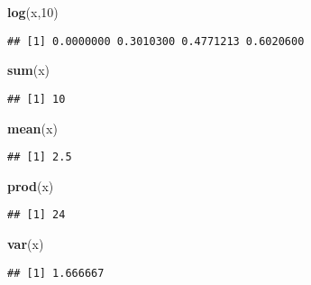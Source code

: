 \documentclass[]{article}
\newenvironment{Shaded}{\begin{snugshade}}{\end{snugshade}}
\newcommand{\KeywordTok}[1]{\textcolor[rgb]{0.13,0.29,0.53}{\textbf{#1}}}
\newcommand{\DecValTok}[1]{\textcolor[rgb]{0.00,0.00,0.81}{#1}}
\newcommand{\NormalTok}[1]{#1}
\begin{document}
\begin{Shaded}
\begin{Highlighting}[]
\KeywordTok{log}\NormalTok{(x,}\DecValTok{10}\NormalTok{)}
\end{Highlighting}
\end{Shaded}

\begin{verbatim}
## [1] 0.0000000 0.3010300 0.4771213 0.6020600
\end{verbatim}

\begin{Shaded}
\begin{Highlighting}[]
\KeywordTok{sum}\NormalTok{(x)}
\end{Highlighting}
\end{Shaded}

\begin{verbatim}
## [1] 10
\end{verbatim}

\begin{Shaded}
\begin{Highlighting}[]
\KeywordTok{mean}\NormalTok{(x)}
\end{Highlighting}
\end{Shaded}

\begin{verbatim}
## [1] 2.5
\end{verbatim}

\begin{Shaded}
\begin{Highlighting}[]
\KeywordTok{prod}\NormalTok{(x)}
\end{Highlighting}
\end{Shaded}

\begin{verbatim}
## [1] 24
\end{verbatim}

\begin{Shaded}
\begin{Highlighting}[]
\KeywordTok{var}\NormalTok{(x)}
\end{Highlighting}
\end{Shaded}

\begin{verbatim}
## [1] 1.666667
\end{verbatim}
\end{document}
